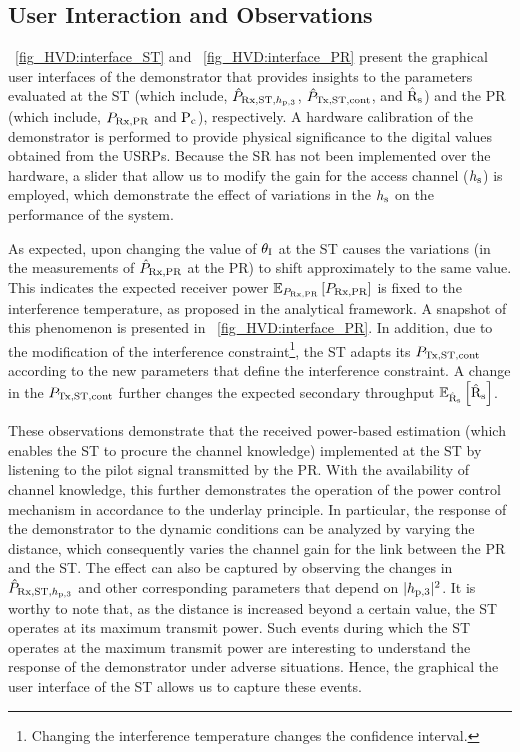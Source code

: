 \subsection{User Interaction and Observations}

\figurename~\ref{fig_HVD:interface_ST} and \figurename~\ref{fig_HVD:interface_PR} present the graphical user interfaces of the demonstrator that provides insights to the parameters evaluated at the ST (which include, $\hat{P}_{\text{Rx,ST,$h_{\text{p,3}}$}}$, $\hat{P}_{\text{Tx,ST,cont}}$, and $\hat{\text{{R}}}_{\text{s}}$) and the PR (which include, $P_{\text{Rx,PR}}$ and $\text{P}_{\text{c}}$), respectively. A hardware calibration of the demonstrator is performed to provide physical significance to the digital values obtained from the USRPs. Because the SR has not been implemented over the hardware, a slider that allow us to modify the gain for the access channel ($h_{\text{s}}$) is employed, which demonstrate the effect of variations in the $h_{\text{s}}$ on the performance of the system. %

As expected, upon changing the value of $\theta_{\text{I}}$ at the ST causes the variations (in the measurements of $\hat{P}_{\text{Rx,PR}}$ at the PR) to shift approximately to the same value. This indicates the expected receiver power ${\mathbb E}_{P_{\text{Rx,PR}}}\left[ P_{\text{Rx,PR}} \right]$ is fixed to the interference temperature, as proposed in the analytical framework. A snapshot of this phenomenon is presented in \figurename~\ref{fig_HVD:interface_PR}. In addition, due to the modification of the interference constraint\footnote{Changing the interference temperature changes the confidence interval.}, the ST adapts its $P_{\text{Tx,ST,cont}}$ according to the new parameters that define the interference constraint. A change in the $P_{\text{Tx,ST,cont}}$ further changes the expected secondary throughput ${\mathbb E}_{\hat{\text{{R}}}_{\text{s}}}\left[ \hat{\text{{R}}}_{\text{s}} \right]$. 

These observations demonstrate that the received power-based estimation (which enables the ST to procure the channel knowledge) implemented at the ST by listening to the pilot signal transmitted by the PR. With the availability of channel knowledge, this further demonstrates the operation of the power control mechanism in accordance to the underlay principle. In particular, the response of the demonstrator to the dynamic conditions can be analyzed by varying the distance, which consequently varies the channel gain for the link between the PR and the ST. The effect can also be captured by observing the changes in $\hat{P}_{\text{Rx,ST,$h_{\text{p,3}}$}}$ and other corresponding parameters that depend on $|h_{\text{p,3}}|^2$. It is worthy to note that, as the distance is increased beyond a certain value, the ST operates at its maximum transmit power. Such events during which the ST operates at the maximum transmit power are interesting to understand the response of the demonstrator under adverse situations. Hence, the graphical the user interface of the ST allows us to capture these events.

